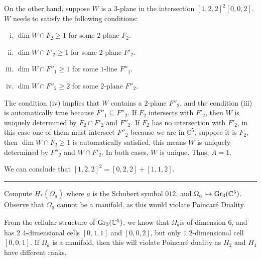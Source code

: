 \documentclass[letterpaper, 12pt]{article}
\begin{document}
\begin{solution}
On the other hand, suppose \(W\) is a \(3\)-plane in the intersection \([1,2,2]^2[0,0,2]\). \(W\) needs to satisfy the following conditions:
\begin{enumerate}[(i)]
\item \(\dim W\cap F_2\geq 1\) for some \(2\)-plane \(F_2\). 
\item \(\dim W\cap F'_2\geq 1\) for some \(2\)-plane \(F'_2\).
\item \(\dim W\cap F''_1\geq 1\) for some \(1\)-line \(F''_1\).
\item \(\dim W\cap F''_2\geq 2\) for some \(2\)-plane \(F''_2\). 
\end{enumerate}
The condition (iv) implies that \(W\) contains a \(2\)-plane \(F''_2\), and the condition (iii) is automatically true because \(F''_1\subseteq F''_2\). If \(F_2\) intersects with \(F'_2\), then \(W\) is uniquely determined by \(F_2\cap F'_2\) and \(F''_2\). If \(F_2\) has no intersection with \(F'_2\), in this case one of them must intersect \(F''_2\) because we are in \(\mathbb{C}^5\), suppose it is \(F_2\), then \(\dim W\cap F_2\geq 1\) is automatically satisfied, this means \(W\) is uniquely determined by \(F''_2\) and \(W\cap F'_2\). In both cases, \(W\) is unique. Thus, \(A=1\).

We can conclude that \([1,2,2]^2=[0,2,2]+[1,1,2]\).

\end{solution}

\noindent\rule{7in}{2.8pt}
\begin{problem}{2}
Compute \(H_*(\Omega_{\underline{a}})\) where \(\underline{a}\) is the Schubert symbol \(012\), and \(\Omega_{\underline{a}}\hookrightarrow \text{Gr}_3(\mathbb{C}^5)\). Observe that \(\Omega_{\underline{a}}\) cannot be a manifold, as this would violate Poincaré Duality.
\end{problem}
\begin{solution}
From the cellular structure of \(\text{Gr}_3(\mathbb{C}^5)\), we know that \(\Omega_{\underline{a}}\)is of dimension \(6\), and has \(2\) 4-dimensional cells \([0,1,1]\) and \([0,0,2]\), but only \(1\) 2-dimensional cell \([0,0,1]\). If \(\Omega_{\overline{a}}\) is a manifold, then this will violate Poincaré duality as \(H_2\) and \(H_4\) have different ranks.
\end{solution}
\end{document}
